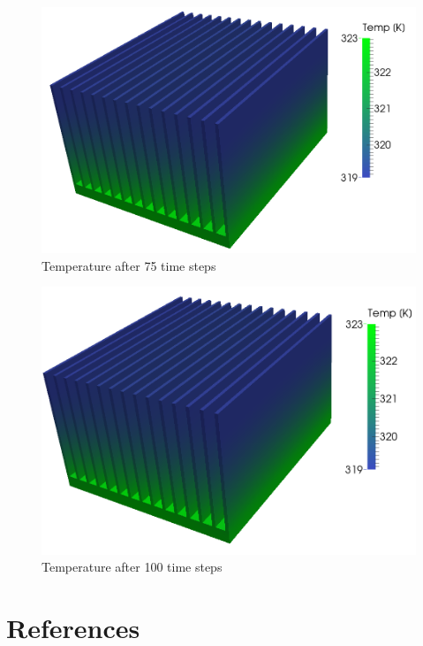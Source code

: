 \documentclass[12pt]{article}
\begin{document}
	\begin{figure}[H]
    \includegraphics[scale=0.3]{sink-MPI/heatSink_mpi_ts75.png}
    \centering
    \caption{Temperature after 75 time steps}
	\end{figure}	
	\begin{figure}[H]
    \includegraphics[scale=0.3]{sink-MPI/heatSink_mpi_ts99.png}
    \centering
    \caption{Temperature after 100 time steps}
	\end{figure}	

	\section{References}
	
	
	
	
	
	
	
\end{document}
